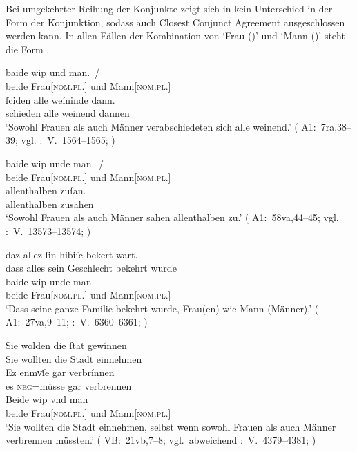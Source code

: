 Bei umgekehrter Reihung der Konjunkte zeigt sich in 
kein Unterschied in der Form der Konjunktion, sodass auch Closest Conjunct
Agreement ausgeschlossen werden kann. In allen Fällen der Kombination von
 `Frau (\NeutF)' und  `Mann (\MascM)' steht die
Form .

\begin{exe}
\ex \label{ex:konjmixbeide2}
	\begin{xlist}
	\ex \label{ex:konjmixbeide2_1}
		\gll baide wip und man.~/ \\
			beide Frau[\textsc{nom.pl.\NeutF}] und Mann[\textsc{nom.pl.\MascM}] \\ %
	\sn \gll ſciden alle weíninde dann. \\
			schieden alle weinend dannen \\
		\trans `Sowohl Frauen als auch Männer verabschiedeten sich alle
			weinend.'
			(%
				A1:~7ra,38--39; vgl.
				\KC:~V.~1564--1565;
				\cite[110]{schroeder1895}%
			)

	\ex \label{ex:konjmixbeide2_2}
		\gll baide wip unde man.~/ \\
			beide Frau[\textsc{nom.pl.\NeutF}] und Mann[\textsc{nom.pl.\MascM}] \\ %
	\sn \gll allenthalben zuſan. \\
			allenthalben zusahen \\
		\trans `Sowohl Frauen als auch Männer sahen allenthalben zu.'
			(%
				A1:~58va,44--45; vgl.
				\KC:~V.~13573--13574;
				\cite[327]{schroeder1895}%
			)

	\ex \label{ex:konjmixbeide2_3}
		\gll daz allez ſin hibiſc bekert wart. \\
			dass alles sein Geschlecht bekehrt wurde \\
	\sn \gll baide wip unde man. \\
			beide Frau[\textsc{nom.pl.\NeutF}] und Mann[\textsc{nom.pl.\MascM}] \\
		\trans `Dass seine ganze Familie bekehrt wurde, Frau(en) wie Mann (Männer).'
			(%
				A1:~27va,9--11;
				\KC:~V.~6360--6361;
				\cite[198]{schroeder1895}%
			)

	\ex \label{ex:konjmixbeide2_4}
		\gll Sie wolden die ſtat gewínnen \\
			Sie wollten die Stadt einnehmen \\
	\sn \gll Ez enmvͤſe gar verbrínnen \\
			es \textsc{neg}=müsse gar verbrennen \\
	\sn \gll Beide wip vnd man \\
			beide Frau[\textsc{nom.pl.\NeutF}] und Mann[\textsc{nom.pl.\MascM}] \\
		\trans `Sie wollten die Stadt einnehmen, selbst wenn
		sowohl Frauen als auch Männer  verbrennen müssten.'
			(%
				VB:~21vb,7--8; vgl.~abweichend
				\KC:~V.~4379--4381;
				\cite[161]{schroeder1895}%
			)
	\end{xlist}
\end{exe}

